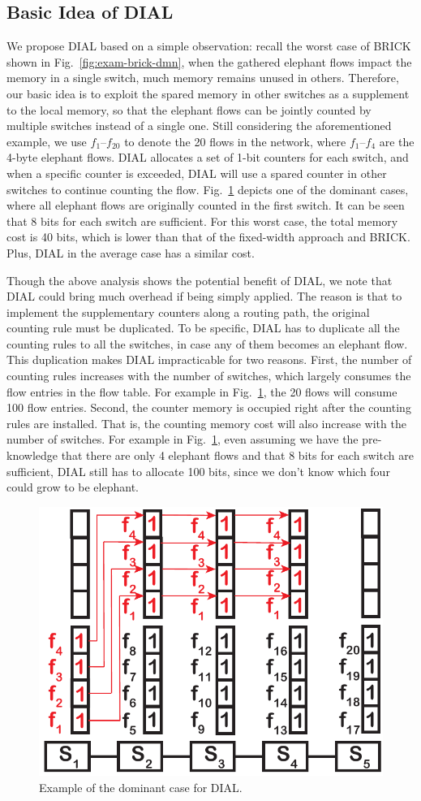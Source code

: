 \subsection{Basic Idea of DIAL}\label{sec:to-idea}
We propose DIAL based on a simple observation:
recall the worst case of BRICK shown in Fig.~\ref{fig:exam-brick-dmn}, when the gathered elephant flows impact the memory in a single switch, much memory remains unused in others.
Therefore, our basic idea is to exploit the spared memory in other switches as a supplement to the local memory, so that the elephant flows can be jointly counted by multiple switches instead of a single one.
Still considering the aforementioned example, we use $f_1$--$f_{20}$ to denote the 20 flows in the network, where $f_1$--$f_4$ are the 4-byte elephant flows.
DIAL allocates a set of 1-bit counters for each switch, and when a specific counter is exceeded, DIAL will use a spared counter in other switches to continue counting the flow.
Fig.~\ref{fig:exam-dial-dmn8} depicts one of the dominant cases, where all elephant flows are originally counted in the first switch.
It can be seen that 8 bits for each switch are sufficient.
For this worst case, the total memory cost is 40 bits, which is lower than that of the fixed-width approach and BRICK.
Plus, DIAL in the average case has a similar cost.

Though the above analysis shows the potential benefit of DIAL, we note that DIAL could bring much overhead if being simply applied.
The reason is that to implement the supplementary counters along a routing path, the original counting rule must be duplicated.
To be specific, DIAL has to duplicate all the counting rules to all the switches, in case any of them becomes an elephant flow.
This duplication makes DIAL impracticable for two reasons.
First, the number of counting rules increases with the number of switches, which largely consumes the flow entries in the flow table.
For example in Fig.~\ref{fig:exam-dial-dmn8}, the 20 flows will consume 100 flow entries.
Second, the counter memory is occupied right after the counting rules are installed.
That is, the counting memory cost will also increase with the number of switches.
For example in Fig.~\ref{fig:exam-dial-dmn8}, even assuming we have the pre-knowledge that there are only 4 elephant flows and that 8 bits for each switch are sufficient, DIAL still has to allocate 100 bits, since we don't know which four could grow to be elephant.

\begin{figure}[t]
    \centering
    \includegraphics[width=0.6\linewidth]{pic/exam-dial-dmn8.pdf}
    \caption{Example of the dominant case for DIAL.}
    \label{fig:exam-dial-dmn8}
    \vspace{-0.2in}
\end{figure}
